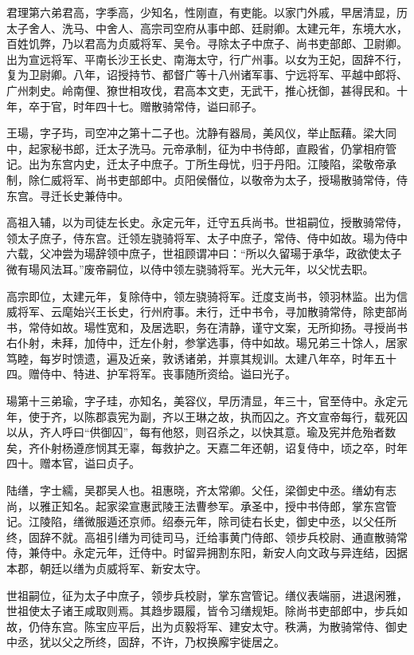 \documentclass[]{article}
\begin{document}
君理第六弟君高，字季高，少知名，性刚直，有吏能。以家门外戚，早居清显，历太子舍人、洗马、中舍人、高宗司空府从事中郎、廷尉卿。太建元年，东境大水，百姓饥弊，乃以君高为贞威将军、吴令。寻除太子中庶子、尚书吏部郎、卫尉卿。出为宣远将军、平南长沙王长史、南海太守，行广州事。以女为王妃，固辞不行，复为卫尉卿。八年，诏授持节、都督广等十八州诸军事、宁远将军、平越中郎将、广州刺史。岭南俚、獠世相攻伐，君高本文吏，无武干，推心抚御，甚得民和。十年，卒于官，时年四十七。赠散骑常侍，谥曰祁子。

王瑒，字子玙，司空冲之第十二子也。沈静有器局，美风仪，举止酝藉。梁大同中，起家秘书郎，迁太子洗马。元帝承制，征为中书侍郎，直殿省，仍掌相府管记。出为东宫内史，迁太子中庶子。丁所生母忧，归于丹阳。江陵陷，梁敬帝承制，除仁威将军、尚书吏部郎中。贞阳侯僭位，以敬帝为太子，授瑒散骑常侍，侍东宫。寻迁长史兼侍中。

高祖入辅，以为司徒左长史。永定元年，迁守五兵尚书。世祖嗣位，授散骑常侍，领太子庶子，侍东宫。迁领左骁骑将军、太子中庶子，常侍、侍中如故。瑒为侍中六载，父冲尝为瑒辞领中庶子，世祖顾谓冲曰：``所以久留瑒于承华，政欲使太子微有瑒风法耳。''废帝嗣位，以侍中领左骁骑将军。光大元年，以父忧去职。

高宗即位，太建元年，复除侍中，领左骁骑将军。迁度支尚书，领羽林监。出为信威将军、云麾始兴王长史，行州府事。未行，迁中书令，寻加散骑常侍，除吏部尚书，常侍如故。瑒性宽和，及居选职，务在清静，谨守文案，无所抑扬。寻授尚书右仆射，未拜，加侍中，迁左仆射，参掌选事，侍中如故。瑒兄弟三十馀人，居家笃睦，每岁时馈遗，遍及近亲，敦诱诸弟，并禀其规训。太建八年卒，时年五十四。赠侍中、特进、护军将军。丧事随所资给。谥曰光子。

瑒第十三弟瑜，字子珪，亦知名，美容仪，早历清显，年三十，官至侍中。永定元年，使于齐，以陈郡袁宪为副，齐以王琳之故，执而囚之。齐文宣帝每行，载死囚以从，齐人呼曰``供御囚''，每有他怒，则召杀之，以快其意。瑜及宪并危殆者数矣，齐仆射杨遵彦悯其无辜，每救护之。天嘉二年还朝，诏复侍中，顷之卒，时年四十。赠本官，谥曰贞子。

陆缮，字士繻，吴郡吴人也。祖惠晓，齐太常卿。父任，梁御史中丞。缮幼有志尚，以雅正知名。起家梁宣惠武陵王法曹参军。承圣中，授中书侍郎，掌东宫管记。江陵陷，缮微服遁还京师。绍泰元年，除司徒右长史，御史中丞，以父任所终，固辞不就。高祖引缮为司徒司马，迁给事黄门侍郎、领步兵校尉、通直散骑常侍，兼侍中。永定元年，迁侍中。时留异拥割东阳，新安人向文政与异连结，因据本郡，朝廷以缮为贞威将军、新安太守。

世祖嗣位，征为太子中庶子，领步兵校尉，掌东宫管记。缮仪表端丽，进退闲雅，世祖使太子诸王咸取则焉。其趋步蹑履，皆令习缮规矩。除尚书吏部郎中，步兵如故，仍侍东宫。陈宝应平后，出为贞毅将军、建安太守。秩满，为散骑常侍、御史中丞，犹以父之所终，固辞，不许，乃权换廨宇徙居之。
\end{document}
